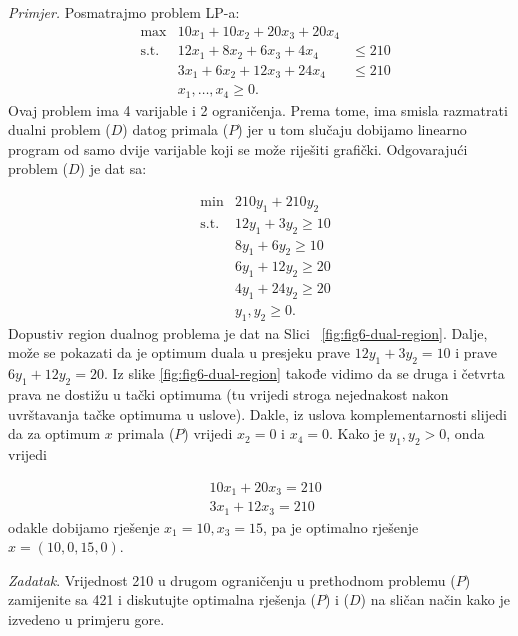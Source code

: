 \documentclass[a4paper, utf8, 11pt, colorlinks]{article}
\begin{document}
\emph{Primjer.} Posmatrajmo problem LP-a:
$$\begin{array}{cccc}
   &\max                     &10 x_1 + 10 x_2 + 20 x_3 + 20 x_4  & \\
   &\mbox{s.t. }      &12 x_1 + 8 x_2  + 6 x_3  + 4 x_4   & \leq 210 \\
    &                        &3 x_1 + 6 x_2   + 12 x_3 + 24 x_4 & \leq 210 \\
     &                       & x_1,\ldots, x_4 \geq 0.                                 &
\end{array}
$$
Ovaj problem ima 4 varijable i 2 ograničenja. Prema tome, ima smisla razmatrati dualni problem  ($D$)  datog primala  ($P$)  jer u tom slučaju dobijamo linearno program od samo dvije varijable koji se može riješiti grafički.  Odgovarajući problem ($D$) je dat sa:

$$\begin{array}{ccc}
    &\min                    &  210 y_1 + 210 y_2      \\
    &\mbox{s.t. }     &  12 y_1  + 3   y_2 \geq 10 \\
    &                        &  8  y_1 + 6    y_2 \geq 10 \\
    &                        &  6 y_1 + 12 y_2  \geq 20 \\
    &                        &  4 y_1 + 24 y_2  \geq 20 \\
    &                        &  y_1, y_2 \geq 0.
\end{array}$$
Dopustiv region dualnog problema je dat na Slici~ \ref{fig:fig6-dual-region}. %
Dalje, može se pokazati da je optimum duala u presjeku prave $12 y_1 + 3 y_2 = 10$ i prave $6y_1 + 12 y_2 = 20$. Iz slike \ref{fig:fig6-dual-region} takođe vidimo da se druga i četvrta prava ne dostižu u tački optimuma (tu vrijedi stroga nejednakost nakon uvrštavanja tačke optimuma u uslove). Dakle, iz uslova komplementarnosti slijedi da za optimum $x$ primala  ($P$)  vrijedi $x_2 = 0$ i $x_4 = 0$.  Kako je $y_1, y_2 > 0$, onda vrijedi 

\begin{align}
    &10 x_1 + 20 x_3 = 210 \nonumber \\
    & 3x_1 + 12 x_3  = 210 \nonumber
\end{align}
odakle dobijamo rješenje $x_1 = 10, x_3 = 15$, pa je optimalno rješenje $x = (10, 0, 15, 0)$.

\emph{Zadatak}. Vrijednost 210 u drugom ograničenju u prethodnom problemu  ($P$)  zamijenite sa 421 i diskutujte optimalna rješenja  ($P$)  i  ($D$)  na sličan način kako je izvedeno  u primjeru gore.
\end{document}
